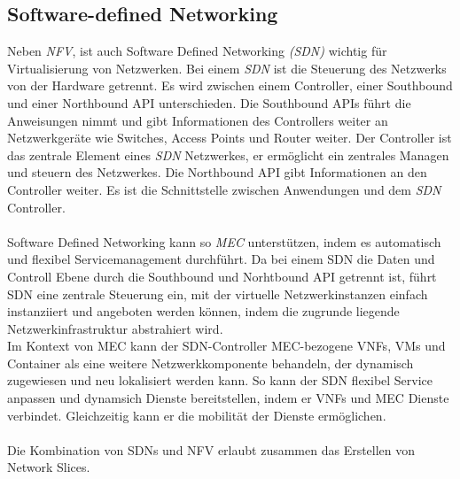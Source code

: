 \documentclass[runningheads]{llncs}
\numberwithin{figure}{section}
\begin{document}
\subsection{Software-defined Networking}
\label{subsec:Software-defined Networking}
Neben \textit{NFV}, ist auch Software Defined Networking \textit{(SDN)} wichtig für Virtualisierung von Netzwerken.
Bei einem \textit{SDN} ist die Steuerung des Netzwerks von der Hardware getrennt. Es wird zwischen einem Controller, 
einer Southbound und einer
Northbound API unterschieden. 
Die Southbound APIs führt die Anweisungen nimmt und gibt Informationen des Controllers weiter an Netzwerkgeräte wie Switches,
Access Points und Router weiter. Der Controller ist das zentrale Element eines \textit{SDN} Netzwerkes, 
er ermöglicht ein zentrales Managen und steuern des 
Netzwerkes. Die Northbound API gibt Informationen an den Controller weiter. Es ist die Schnittstelle zwischen Anwendungen 
und dem \textit{SDN} Controller.\cite{SoftwareDefinedNetworkingSDN}
\\
\\
Software Defined Networking kann so \textit{MEC} unterstützen, indem es automatisch und flexibel Servicemanagement durchführt.
Da bei einem SDN die Daten und Controll Ebene durch die Southbound und Norhtbound API getrennt ist, 
führt SDN eine zentrale Steuerung ein, 
mit der virtuelle Netzwerkinstanzen einfach instanziiert und angeboten werden können, 
indem die zugrunde liegende Netzwerkinfrastruktur abstrahiert wird. \\
Im Kontext von MEC kann der SDN-Controller MEC-bezogene VNFs, 
VMs und Container als eine weitere Netzwerkkomponente behandeln, der dynamisch zugewiesen und neu lokalisiert werden kann.
So kann der SDN flexibel Service anpassen und dynamsich Dienste bereitstellen, indem er VNFs und MEC Dienste verbindet.
Gleichzeitig kann er die mobilität der Dienste ermöglichen.
\\
\\
Die Kombination von SDNs und NFV erlaubt zusammen das Erstellen von Network Slices. 
\end{document}
